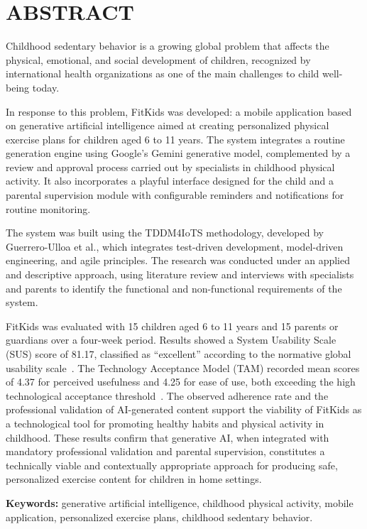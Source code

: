\documentclass[12pt,a4paper,oneside]{report}
\begin{document}
	\chapter*{ABSTRACT}
		Childhood sedentary behavior is a growing global problem that affects the physical, emotional, and social development of children, recognized by international health organizations as one of the main challenges to child well-being today.
		
		In response to this problem, FitKids was developed: a mobile application based on generative artificial intelligence aimed at creating personalized physical exercise plans for children aged 6 to 11 years. The system integrates a routine generation engine using Google's Gemini generative model, complemented by a review and approval process carried out by specialists in childhood physical activity. It also incorporates a playful interface designed for the child and a parental supervision module with configurable reminders and notifications for routine monitoring.
		
		The system was built using the TDDM4IoTS methodology, developed by Guerrero-Ulloa et al., which integrates test-driven development, model-driven engineering, and agile principles. The research was conducted under an applied and descriptive approach, using literature review and interviews with specialists and parents to identify the functional and non-functional requirements of the system.
		
		FitKids was evaluated with 15 children aged 6 to 11 years and 15 parents or guardians over a four-week period. Results showed a System Usability Scale (SUS) score of 81.17, classified as ``excellent'' according to the normative global usability scale~\cite{Bangor2008}. The Technology Acceptance Model (TAM) recorded mean scores of 4.37 for perceived usefulness and 4.25 for ease of use, both exceeding the high technological acceptance threshold~\cite{Venkatesh2003}. The observed adherence rate and the professional validation of AI-generated content support the viability of FitKids as a technological tool for promoting healthy habits and physical activity in childhood. These results confirm that generative AI, when integrated with mandatory professional validation and parental supervision, constitutes a technically viable and contextually appropriate approach for producing safe, personalized exercise content for children in home settings.
		
		
		\vspace{0.5cm}
		\noindent\textbf{Keywords:} generative artificial intelligence, childhood physical activity, mobile application, personalized exercise plans, childhood sedentary behavior.
		\clearpage
		
\end{document}
